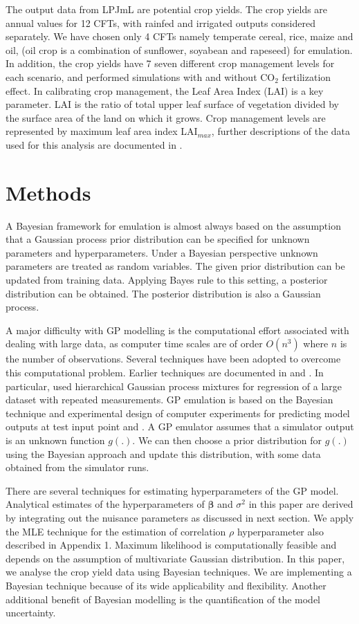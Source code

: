 The output data from LPJmL are potential crop yields. The crop yields are annual values for 12 CFTs, with rainfed and irrigated outputs considered separately. We have chosen only 4 CFTs namely temperate cereal, rice, maize and oil, (oil crop is a combination of sunflower, soyabean and rapeseed) for emulation. In addition, the crop yields have 7 seven different crop management levels for each scenario, and performed simulations with and without CO$_2$ fertilization effect. In calibrating crop management, the Leaf Area Index (LAI) is a key parameter. LAI is the ratio of total upper leaf surface of vegetation divided by the surface area of the land on which it grows. Crop management levels are represented by maximum leaf area index LAI$_{max}$, further descriptions of the data used for this analysis are documented in \cite{qwole}.


\section{Methods}
 A Bayesian framework for emulation is almost always based on the assumption that a Gaussian process prior distribution can be specified for unknown parameters and hyperparameters.  Under a Bayesian perspective unknown parameters are treated as random variables. The given prior distribution can be updated from training data. Applying Bayes rule to this setting, a posterior distribution can be obtained. The posterior distribution is also a Gaussian process. 

A major difficulty with GP modelling is the computational effort associated with dealing with large data, as computer time scales are of order $O(n^3)$ where $n$ is the number of observations. Several techniques have been adopted to overcome this computational problem. Earlier techniques are documented in \citet{q10} and \cite{q47}. In particular, \cite{q18} used hierarchical Gaussian process mixtures for regression of a large dataset with repeated measurements. 
GP emulation is based on the Bayesian technique and experimental design of computer experiments for predicting model outputs at test input point \citet{q7} and \citet{70}. A GP emulator assumes that a simulator output is an unknown function $g(.)$. We can then choose a prior distribution for $g(.)$ using the Bayesian approach and update this distribution, with some data obtained from the simulator runs.

There are several techniques for estimating hyperparameters of the GP model. Analytical estimates of the hyperparameters of $\boldsymbol \beta$ and $\sigma^2$ in this paper are derived by integrating out the nuisance parameters as discussed in next section. We apply the MLE technique for the estimation of correlation $\rho$ hyperparameter also described in Appendix 1. Maximum likelihood is computationally feasible and depends on the assumption of multivariate Gaussian distribution.
In this paper, we analyse the crop yield data using Bayesian techniques. We are implementing a Bayesian technique because of its wide applicability and flexibility. Another additional benefit of Bayesian modelling is the quantification of the model uncertainty.

